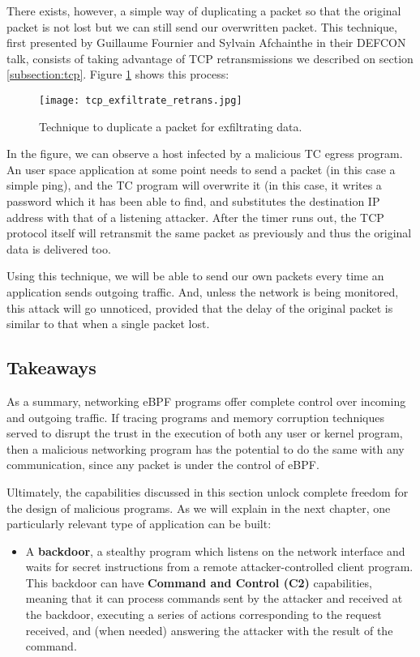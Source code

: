 There exists, however, a simple way of duplicating a packet so that the original packet is not lost but we can still send our overwritten packet. This technique, first presented by Guillaume Fournier and Sylvain Afchainthe in their DEFCON talk, consists of taking advantage of TCP retransmissions we described on section \ref{subsection:tcp}. Figure \ref{fig:tcp_exfiltrate_retrans} shows this process:

\begin{figure}[H]
	\centering
	\texttt{[image: tcp\_exfiltrate\_retrans.jpg]}
	\caption{Technique to duplicate a packet for exfiltrating data.}
	\label{fig:tcp_exfiltrate_retrans}
\end{figure}

In the figure, we can observe a host infected by a malicious TC egress program. An user space application at some point needs to send a packet (in this case a simple ping), and the TC program will overwrite it (in this case, it writes a password which it has been able to find, and substitutes the destination IP address with that of a listening attacker.
After the timer runs out, the TCP protocol itself will retransmit the same packet as previously and thus the original data is delivered too.

Using this technique, we will be able to send our own packets every time an application sends outgoing traffic. And, unless the network is being monitored, this attack will go unnoticed, provided that the delay of the original packet is similar to that when a single packet lost.

\subsection{Takeaways}
As a summary, networking eBPF programs offer complete control over incoming and outgoing traffic. If tracing programs and memory corruption techniques served to disrupt the trust in the execution of both any user or kernel program, then a malicious networking program has the potential to do the same with any communication, since any packet is under the control of eBPF.

Ultimately, the capabilities discussed in this section unlock complete freedom for the design of malicious programs. As we will explain in the next chapter, one particularly relevant type of application can be built:
\begin{itemize}
\item A \textbf{backdoor}, a stealthy program which listens on the network interface and waits for secret instructions from a remote attacker-controlled client program. This backdoor can have \textbf{Command and Control (C2)} capabilities, meaning that it can process commands sent by the attacker and received at the backdoor, executing a series of actions corresponding to the request received, and (when needed) answering the attacker with the result of the command.
\end{itemize}

